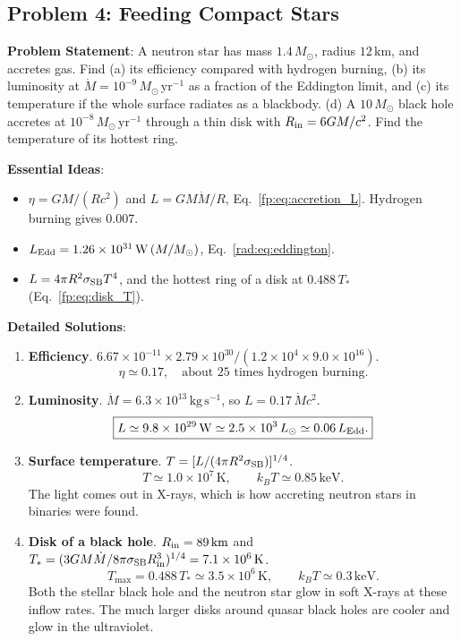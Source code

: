 \subsection{Problem 4: Feeding Compact Stars}
\label{fp:prob:accretion}

\textbf{Problem Statement}: A neutron star has mass $1.4\,M_\odot$, radius $12\,\mathrm{km}$, and accretes gas. Find (a) its efficiency compared with hydrogen burning, (b) its luminosity at $\dot M=10^{-9}\,M_\odot\,\mathrm{yr^{-1}}$ as a fraction of the Eddington limit, and (c) its temperature if the whole surface radiates as a blackbody. (d) A $10\,M_\odot$ black hole accretes at $10^{-8}\,M_\odot\,\mathrm{yr^{-1}}$ through a thin disk with $R_{\rm in}=6GM/c^2$. Find the temperature of its hottest ring.

\textbf{Essential Ideas}:
\begin{itemize}
	\item $\eta=GM/(Rc^2)$ and $L=GM\dot M/R$, Eq.~\eqref{fp:eq:accretion_L}. Hydrogen burning gives $0.007$.
	\item $L_{\rm Edd}=1.26\times10^{31}\,\mathrm W\,(M/M_\odot)$, Eq.~\eqref{rad:eq:eddington}.
	\item $L=4\pi R^2\sigma_{\rm SB}T^4$, and the hottest ring of a disk at $0.488\,T_*$ (Eq.~\eqref{fp:eq:disk_T}).
\end{itemize}

\textbf{Detailed Solutions}:
\begin{enumerate}[label=(\alph*)]
	\item \textbf{Efficiency}. $6.67\times10^{-11}\times2.79\times10^{30}/(1.2\times10^4\times9.0\times10^{16})$.
	\[
	\boxed{\eta\simeq0.17,\quad\text{about }25\text{ times hydrogen burning}.}
	\]
	\item \textbf{Luminosity}. $\dot M=6.3\times10^{13}\,\mathrm{kg\,s^{-1}}$, so $L=0.17\,\dot Mc^2$.
	\[
	\boxed{L\simeq9.8\times10^{29}\,\mathrm W\simeq2.5\times10^3\,L_\odot\simeq0.06\,L_{\rm Edd}.}
	\]
	\item \textbf{Surface temperature}. $T=[L/(4\pi R^2\sigma_{\rm SB})]^{1/4}$.
	\[
	\boxed{T\simeq1.0\times10^7\,\mathrm K,\qquad k_BT\simeq0.85\,\mathrm{keV}.}
	\]
	The light comes out in X-rays, which is how accreting neutron stars in binaries were found.
	\item \textbf{Disk of a black hole}. $R_{\rm in}=89\,\mathrm{km}$ and $T_*=(3GM\dot M/8\pi\sigma_{\rm SB}R_{\rm in}^3)^{1/4}=7.1\times10^6\,\mathrm K$.
	\[
	\boxed{T_{\max}=0.488\,T_*\simeq3.5\times10^6\,\mathrm K,\qquad k_BT\simeq0.3\,\mathrm{keV}.}
	\]
	Both the stellar black hole and the neutron star glow in soft X-rays at these inflow rates. The much larger disks around quasar black holes are cooler and glow in the ultraviolet.
\end{enumerate}


